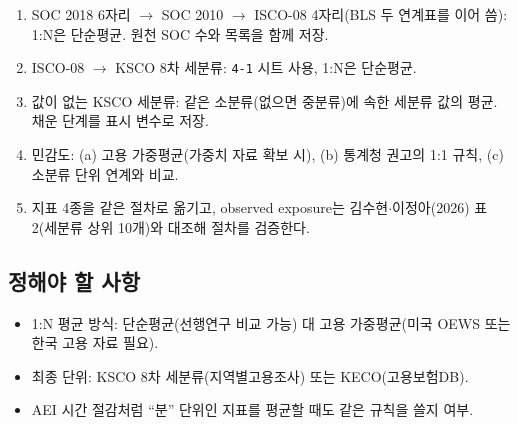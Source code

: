 \documentclass[11pt]{article}
\begin{document}
\begin{enumerate}[label=\arabic*.]
  \item SOC 2018 6자리 $\to$ SOC 2010 $\to$ ISCO-08 4자리(BLS 두 연계표를 이어 씀): 1:N은 단순평균. 원천 SOC 수와 목록을 함께 저장.
  \item ISCO-08 $\to$ KSCO 8차 세분류: \texttt{4-1} 시트 사용, 1:N은 단순평균.
  \item 값이 없는 KSCO 세분류: 같은 소분류(없으면 중분류)에 속한 세분류 값의 평균. 채운 단계를 표시 변수로 저장.
  \item 민감도: (a) 고용 가중평균(가중치 자료 확보 시), (b) 통계청 권고의 1:1 규칙, (c) 소분류 단위 연계와 비교.
  \item 지표 4종을 같은 절차로 옮기고, observed exposure는 김수현$\cdot$이정아(2026) 표 2(세분류 상위 10개)와 대조해 절차를 검증한다.
\end{enumerate}

\subsection{정해야 할 사항}

\begin{itemize}
  \item 1:N 평균 방식: 단순평균(선행연구 비교 가능) 대 고용 가중평균(미국 OEWS 또는 한국 고용 자료 필요).
  \item 최종 단위: KSCO 8차 세분류(지역별고용조사) 또는 KECO(고용보험DB).
  \item AEI 시간 절감처럼 ``분'' 단위인 지표를 평균할 때도 같은 규칙을 쓸지 여부.
\end{itemize}

\printbibliography
\end{document}
